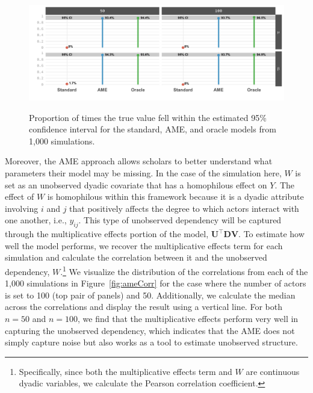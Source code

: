 \begin{figure}
	\centering
	\caption{Proportion of times the true value fell within the estimated 95\% confidence interval for the standard, AME, and oracle models from 1,000 simulations.}
	\label{fig:ameCalib}
	\includegraphics[width=1\textwidth]{graphics/figure4.pdf} \\
\end{figure}

Moreover, the AME approach allows scholars to better understand what parameters their model may be missing. In the case of the simulation here, $W$ is set as an unobserved dyadic covariate that has a homophilous effect on $Y$. The effect of $W$ is homophilous within this framework because it is a dyadic attribute involving $i$ and $j$ that positively affects the degree to which actors interact with one another, i.e., $y_{ij}$. This type of unobserved dependency will be captured through the multiplicative effects portion of the model, $\mathbf{U}^{\top} \mathbf{D} \mathbf{V}$. To estimate how well the model performs, we recover the multiplicative effects term for each simulation and calculate the correlation between it and the unobserved dependency, $W$.\footnote{Specifically, since both the multiplicative effects term and $W$ are continuous dyadic variables, we calculate the Pearson correlation coefficient.} We visualize the distribution of the correlations from each of the 1,000 simulations in Figure~\ref{fig:ameCorr} for the case where the number of actors is set to 100 (top pair of panels) and 50. Additionally, we calculate the median across the correlations and display the result using a vertical line. For both $n=50$ and $n=100$, we find that the multiplicative effects perform very well in capturing the unobserved dependency, which indicates that the AME does not simply capture noise but also works as a tool to estimate unobserved structure.

